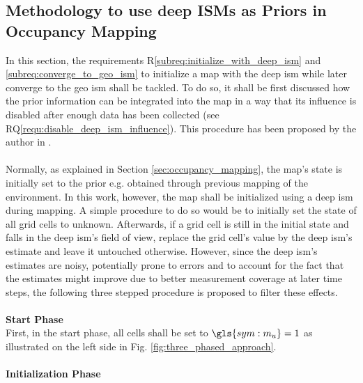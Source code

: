 \subsection{Methodology to use deep ISMs as Priors in Occupancy Mapping}
\label{subsec:method_to_use_deep_isms_as_priors_in_occmaps}
In this section, the requirements R\ref{subreq:initialize_with_deep_ism} and \ref{subreq:converge_to_geo_ism} to initialize a map with the deep \gls{ism} while later converge to the geo \gls{ism} shall be tackled. To do so, it shall be first discussed how the prior information can be integrated into the map in a way that its influence is disabled after enough data has been collected (see RQ\ref{requ:disable_deep_ism_influence}). This procedure has been proposed by the author in \cite{bauer2020deep}.
\\\\
Normally, as explained in Section \ref{sec:occupancy_mapping}, the map's state is initially set to the prior e.g. obtained through previous mapping of the environment. In this work, however, the map shall be initialized using a deep \gls{ism} during mapping. A simple procedure to do so would be to initially set the state of all grid cells to unknown. Afterwards, if a grid cell is still in the initial state and falls in the deep \gls{ism}'s field of view, replace the grid cell's value by the deep \gls{ism}'s estimate and leave it untouched otherwise. However, since the deep \gls{ism}'s estimates are noisy, potentially prone to errors and to account for the fact that the estimates might improve due to better measurement coverage at later time steps, the following three stepped procedure is proposed to filter these effects. 
\\\\
\textbf{Start Phase}\\
First, in the start phase, all cells shall be set to $\gls{sym:m_u} = 1$ as illustrated on the left side in Fig. \ref{fig:three_phased_approach}. 
\\\\
\textbf{Initialization Phase}\\
